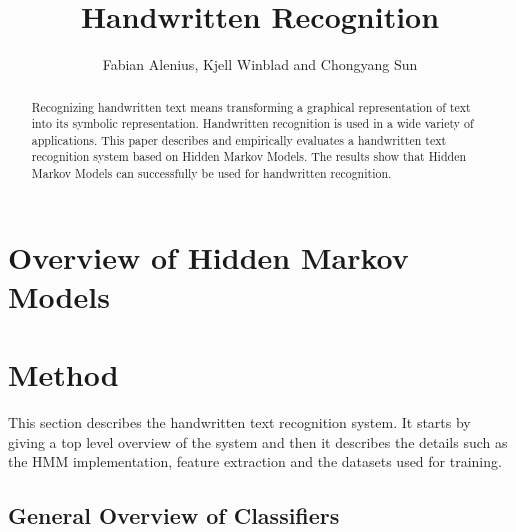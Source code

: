 \documentclass[11pt]{article}
\author{Fabian Alenius, Kjell Winblad and Chongyang Sun} \title{Handwritten Recognition}
\begin{document}
\maketitle

\begin{abstract}
Recognizing handwritten text means transforming a graphical representation of text into its symbolic representation.
Handwritten recognition is used in a wide variety of applications.
This paper describes and empirically evaluates a handwritten text recognition system based on Hidden Markov Models.
The results show that Hidden Markov Models can successfully be used for handwritten recognition.

\end{abstract}





\section{Overview of Hidden Markov Models}



\section{Method}\label{sec:method}

This section describes the handwritten text recognition system. It starts by giving a top level overview of the system and then it describes the details such as the HMM implementation, feature extraction and the datasets used for training. 


\subsection{General Overview of Classifiers}\label{sec:overview_of_classifiers}



\end{document}
